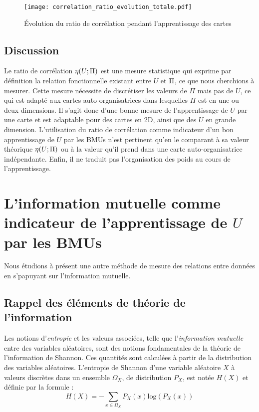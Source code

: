 \documentclass[../main]{subfiles}
\begin{document}
\begin{figure}
    \texttt{[image: correlation\_ratio\_evolution\_totale.pdf]}
    \caption{\'Evolution du ratio de corrélation pendant l'apprentissage des cartes\label{fig:cr_evol}}
\end{figure}

\subsection{Discussion}

Le ratio de corrélation $\eta(U;\Pi)$ est une mesure statistique qui exprime par définition la relation fonctionnelle existant entre $U$ et $\Pi$, ce que nous cherchions à mesurer. 
Cette mesure nécessite de discrétiser les valeurs de $\Pi$ mais pas de $U$, ce qui est adapté aux cartes auto-organisatrices dans lesquelles $\Pi$ est en une ou deux dimensions. Il s'agit donc d'une bonne mesure de l'apprentissage de $U$ par une carte et est adaptable pour des cartes en 2D, ainsi que des $U$ en grande dimension.
L'utilisation du ratio de corrélation comme indicateur d'un bon apprentissage de $U$ par les BMUs n'est pertinent qu'en le comparant à sa valeur théorique $\eta(U;\Pi)$ ou à la valeur qu'il prend dans une carte auto-organisatrice indépendante.
Enfin, il ne traduit pas l'organisation des poids au cours de l'apprentissage.

\section{L'information mutuelle comme indicateur de l'apprentissage de $U$ par les BMUs}

Nous étudions à présent une autre méthode de mesure des relations entre données en s'papuyant sur l'information mutuelle.

\subsection{Rappel des éléments de théorie de l'information}

Les notions d'\emph{entropie} et les valeurs associées, telle que l'\emph{information mutuelle} entre des variables aléatoires, sont des notions fondamentales de la théorie de l'information de Shannon. Ces quantités sont calculées à partir de la distribution des variables aléatoires.
L'entropie de Shannon d'une variable aléatoire $X$ à valeurs discrètes dans un ensemble $\Omega_X$, de distribution $P_X$, est notée $H(X)$ et définie par la formule : 
\begin{equation}
H(X) = - \sum_{x \in \Omega_X}{P_X(x)\textrm{log}(P_X(x))}
\end{equation}
\end{document}
